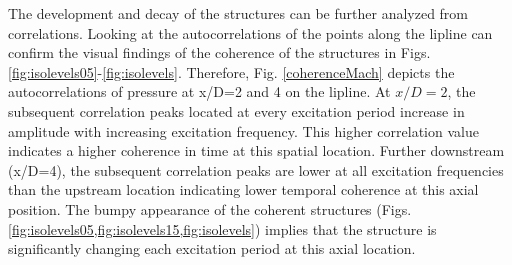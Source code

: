 \documentclass[english]{aiaa-tc}
\begin{document}
The development and decay of the structures can be further analyzed from correlations. Looking at the autocorrelations of the points along the lipline can confirm the visual findings of the coherence of the structures in Figs. \ref{fig:isolevels05}-\ref{fig:isolevels}. 
Therefore, Fig. \ref{coherenceMach} depicts the autocorrelations of pressure at x/D=2 and 4 on the lipline. 
At $x/D=2$, the subsequent correlation peaks located at every excitation period increase in amplitude with increasing excitation frequency. This higher correlation value indicates a higher coherence in time at this spatial location. 
Further downstream (x/D=4), the subsequent correlation peaks are lower at all excitation frequencies than the upstream location indicating lower temporal coherence at this axial position. 
The bumpy appearance of the coherent structures (Figs. \ref{fig:isolevels05,fig:isolevels15,fig:isolevels}) implies that the structure is significantly changing each excitation period at this axial location. 
\end{document}
